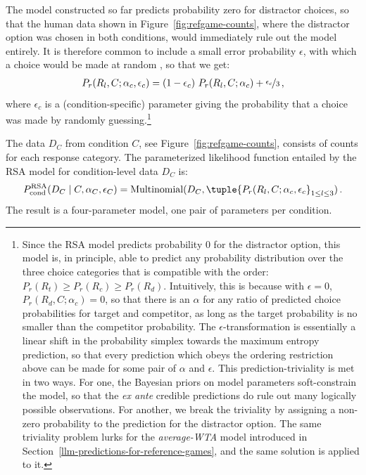 \documentclass[fleqn]{article}
\begin{document}
The model constructed so far predicts probability zero for distractor choices, so that the human data shown in Figure~\ref{fig:refgame-counts}, where the distractor option was chosen in both conditions, would immediately rule out the model entirely.
It is therefore common to include a small error probability $\epsilon$, with which a choice would be made at random \citep[e.g.,][]{LeeWagenmakers2013:Bayesian-Cognit}, so that we get:
%
\begin{align*}
  P_{r}(R_{l}, C; \alpha_{c}, \epsilon_{c}) = (1 - \epsilon_{c}) \  P_{r}(R_{l}, C; \alpha_{c}) +  \nicefrac{\epsilon_{c}}{3}\,,
\end{align*}
%
where $\epsilon_{c}$ is a (condition-specific) parameter giving the probability that a choice was made by randomly guessing.\footnote{
  Since the RSA model predicts probability 0 for the distractor option, this model is, in principle, able to predict any probability distribution over the three choice categories that is compatible with the order: $P_{r}(R_{t}) \ge P_{r}(R_{c}) \ge P_{r}(R_{d})$.
  Intuitively, this is because with $\epsilon=0$, $P_{r}(R_{d}, C; \alpha_{c}) = 0$, so that there is an $\alpha$ for any ratio of predicted choice probabilities for target and competitor, as long as the target probability is no smaller than the competitor probability.
  The $\epsilon$-transformation is essentially a linear shift in the probability simplex towards the maximum entropy prediction, so that every prediction which obeys the ordering restriction above can be made for some pair of $\alpha$ and $\epsilon$.
  This prediction-triviality is met in two ways.
  For one, the Bayesian priors on model parameters soft-constrain the model, so that the \emph{ex ante} credible predictions do rule out many logically possible observations.
  For another, we break the triviality by assigning a non-zero probability to the prediction for the distractor option.
  The same triviality problem lurks for the \emph{average-WTA} model introduced in Section~\ref{llm-predictions-for-reference-games}, and the same solution is applied to it.
}

The data $D_{C}$ from condition $C$, see Figure~\ref{fig:refgame-counts}, consists of counts for each response category.
The parameterized likelihood function entailed by the RSA model for condition-level data $D_{C}$ is:
%
\begin{align}
  \label{eq:RSA-likelihood}
 P^{\text{RSA}}_{\text{cond}}(D_{C} \mid C, \alpha_{C}, \epsilon_{C}) = \text{Multinomial}(D_{C}, \tuple{P_{r}(R_{l}, C; \alpha_{c}, \epsilon_{c}}_{1 \le l \le 3})\,.
\end{align}
%
The result is a four-parameter model, one pair of parameters per condition.
\end{document}
